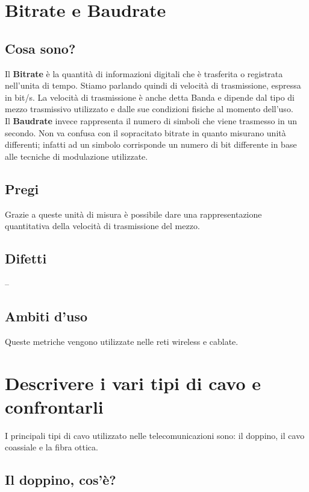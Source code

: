 \section{Bitrate e Baudrate}
\subsection{Cosa sono?}
Il \textbf{Bitrate} è la quantità di informazioni digitali che è trasferita o registrata nell’unita di tempo.
Stiamo parlando quindi di velocità di trasmissione, espressa in bit/s.
La velocità di trasmissione è anche detta Banda e dipende dal tipo di mezzo trasmissivo utilizzato e dalle sue condizioni fisiche al momento dell’uso.
\\
Il \textbf{Baudrate} invece rappresenta il numero di simboli che viene trasmesso in un secondo.
Non va confusa con il sopracitato bitrate in quanto misurano unità differenti; infatti ad un simbolo corrisponde un numero di bit differente in base alle tecniche di modulazione utilizzate.

\subsection{Pregi}
Grazie a queste unità di misura è possibile dare una rappresentazione quantitativa della velocità di trasmissione del mezzo.

\subsection{Difetti}
--

\subsection{Ambiti d'uso}
Queste metriche vengono utilizzate nelle reti wireless e cablate.

\section{Descrivere i vari tipi di cavo e confrontarli}
I principali tipi di cavo utilizzato nelle telecomunicazioni sono: il doppino, il cavo coassiale e la fibra ottica. \\
\subsection{Il doppino, cos'è?}

